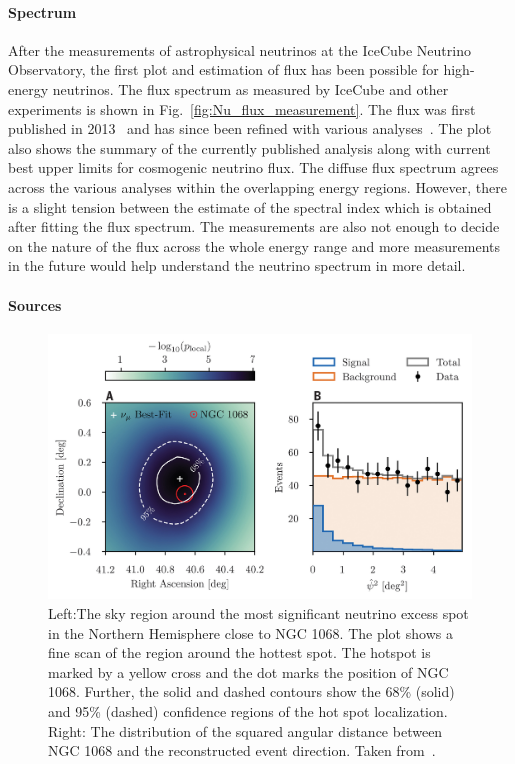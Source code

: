   \paragraph*{Spectrum}
  \label{subsubsec:Nuspectrum}
  After the measurements of astrophysical neutrinos at the IceCube Neutrino Observatory, the first plot and estimation of flux has been possible for high-energy neutrinos. The flux spectrum as measured by IceCube and other experiments is shown in Fig.~\ref{fig:Nu_flux_measurement}. The flux was first published in 2013~\cite{Aartsen_2014_first_flux} and has since been refined with various analyses~\cite{PhysRevD.110.022001}. The plot also shows the summary of the currently published analysis along with current best upper limits for cosmogenic neutrino flux. The diffuse flux spectrum agrees across the various analyses within the overlapping energy regions. However, there is a slight tension between the estimate of the spectral index which is obtained after fitting the flux spectrum. The measurements are also not enough to decide on the nature of the flux across the whole energy range and more measurements in the future would help understand the neutrino spectrum in more detail. 

  \paragraph*{Sources}
  \label{subsubsec:Nusources}
  \begin{figure}[t!]
    \centering
    \includegraphics[width=14.5cm]{thesis_figures/CRnNu/science-abg3395-f2.jpg}
    \caption{Left:The sky region around the most significant neutrino excess spot in the Northern Hemisphere close to NGC 1068. The plot shows a fine scan of the region around the hottest spot. The hotspot is marked by a yellow cross and the dot marks the position of NGC 1068. Further, 
    the solid and dashed contours show the 68\% (solid) and 95\% (dashed) confidence regions of
    the hot spot localization. Right: The distribution of the squared angular distance between NGC 1068 and the reconstructed event direction. Taken from~\cite{Icecube_2022}.}
    \label{fig:NGC1068_excess}
  \end{figure}

